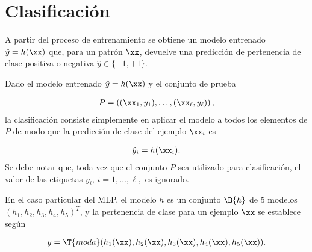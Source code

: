 \section{Clasificación}
A partir del proceso de entrenamiento se obtiene un modelo entrenado
$\hat{y} = h(\xx)$ que, para un patrón $\xx$, devuelve una predicción
de pertenencia de clase positiva o negativa $\hat{y}\in\{-1,+1\}$.

Dado el modelo entrenado $\hat{y} = h(\xx)$ y el conjunto de prueba

\begin{align*}
  P = \left( (\xx_1,y_1),\ldots,(\xx_\ell,y_\ell) \right),
\end{align*}
la clasificación consiste simplemente en aplicar el modelo a todos los
elementos de $P$ de modo que la predicción de clase del ejemplo
$\xx_i$ es

\begin{align*}
  \hat{y}_i = h(\xx_i).
\end{align*}
Se debe notar que, toda vez que el conjunto $P$ sea utilizado para
clasificación, el valor de las etiquetas $y_i,\,i=1,\ldots,\ell,$ es
ignorado.

En el caso particular del MLP, el modelo $h$ es un conjunto $\B{h}$
de 5 modelos $(h_1, h_2, h_3, h_4, h_5)^T$, y la pertenencia de clase para
un ejemplo $\xx$ se establece según

\begin{align}
  y = \T{moda}( h_1(\xx), h_2(\xx), h_3(\xx), h_4(\xx), h_5(\xx)).
\end{align}
